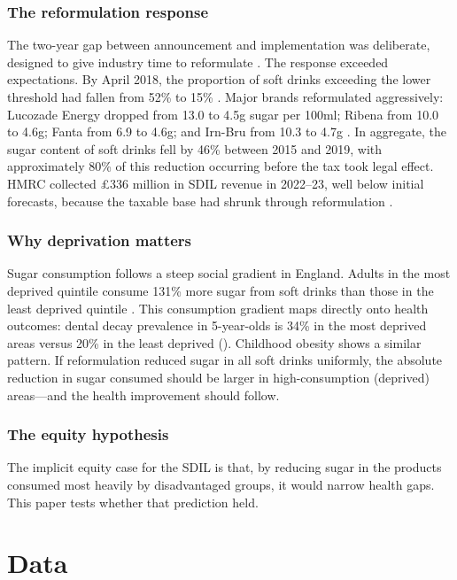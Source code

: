 \documentclass[12pt]{article}
\begin{document}
\subsubsection*{The reformulation response} The two-year gap between announcement and implementation was deliberate, designed to give industry time to reformulate \citep{briggs2017}. The response exceeded expectations. By April 2018, the proportion of soft drinks exceeding the lower threshold had fallen from 52\% to 15\% \citep{bandy2020}. Major brands reformulated aggressively: Lucozade Energy dropped from 13.0 to 4.5g sugar per 100ml; Ribena from 10.0 to 4.6g; Fanta from 6.9 to 4.6g; and Irn-Bru from 10.3 to 4.7g \citep{rogers2023}. In aggregate, the sugar content of soft drinks fell by 46\% between 2015 and 2019, with approximately 80\% of this reduction occurring before the tax took legal effect. HMRC collected \pounds 336 million in SDIL revenue in 2022--23, well below initial forecasts, because the taxable base had shrunk through reformulation \citep{hmrc2023}.

\subsubsection*{Why deprivation matters} Sugar consumption follows a steep social gradient in England. Adults in the most deprived quintile consume 131\% more sugar from soft drinks than those in the least deprived quintile \citep{ndep2020}. This consumption gradient maps directly onto health outcomes: dental decay prevalence in 5-year-olds is 34\% in the most deprived areas versus 20\% in the least deprived (). Childhood obesity shows a similar pattern. If reformulation reduced sugar in all soft drinks uniformly, the absolute reduction in sugar consumed should be larger in high-consumption (deprived) areas---and the health improvement should follow.

\subsubsection*{The equity hypothesis} The implicit equity case for the SDIL is that, by reducing sugar in the products consumed most heavily by disadvantaged groups, it would narrow health gaps. This paper tests whether that prediction held.

\section{Data}
\label{sec:data}
\end{document}

